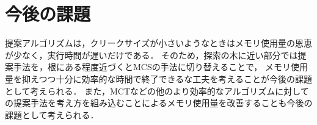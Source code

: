 \section{今後の課題}
提案アルゴリズムは，クリークサイズが小さいようなときはメモリ使用量の恩恵が少なく，実行時間が遅いだけである．
そのため，探索の木に近い部分では提案手法を，根にある程度近づくとMCSの手法に切り替えることで，
メモリ使用量を抑えつつ十分に効率的な時間で終了できるな工夫を考えることが今後の課題として考えられる．
また，MCTなどの他のより効率的なアルゴリズムに対しての提案手法を考え方を組み込むことによるメモリ使用量を改善することも今後の課題として考えられる．

